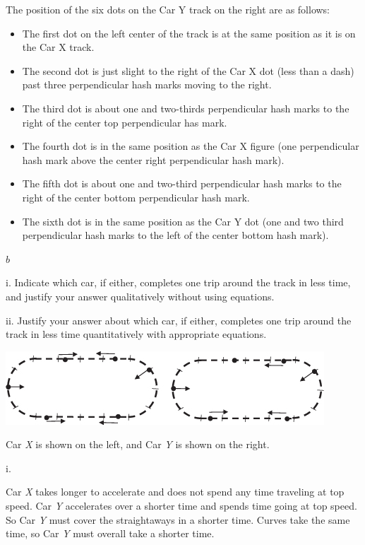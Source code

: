 \documentclass[
]{book}
\providecommand{\tightlist}{%
  \setlength{\itemsep}{0pt}\setlength{\parskip}{0pt}}
\newenvironment{ap-test-prep}{}{}
\begin{document}
\begin{ap-test-prep}
The position of the six dots on the Car Y track on the right are as
follows:

\begin{itemize}
\tightlist
\item
  The first dot on the left center of the track is at the same
  position as it is on the Car X track.
\item
  The second dot is just slight to the right of the Car X dot (less
  than a dash) past three perpendicular hash marks moving to the
  right.
\item
  The third dot is about one and two-thirds perpendicular hash marks
  to the right of the center top perpendicular has mark.
\item
  The fourth dot is in the same position as the Car X figure (one
  perpendicular hash mark above the center right perpendicular hash
  mark).
\item
  The fifth dot is about one and two-third perpendicular hash marks to
  the right of the center bottom perpendicular hash mark.
\item
  The sixth dot is in the same position as the Car Y dot (one and two
  third perpendicular hash marks to the left of the center bottom hash
  mark).
\end{itemize}

\(b\)

i. Indicate which car, if either, completes one trip around the track
in less time, and justify your answer qualitatively without using
equations.

ii. Justify your answer about which car, if either, completes one trip
around the track in less time quantitatively with appropriate equations.

\leavevmode\hypertarget{fs-id1797059}{}%
\includegraphics{images/Figure_04_01_05.jpg}

Car \emph{X} is shown on the left, and Car \emph{Y} is shown on the right.

i.

Car \emph{X} takes longer to accelerate and does not spend any time traveling
at top speed. Car \emph{Y} accelerates over a shorter time and spends time
going at top speed. So Car \emph{Y} must cover the straightaways in a shorter
time. Curves take the same time, so Car \emph{Y} must overall take a shorter
time.


\end{ap-test-prep}
\end{document}

